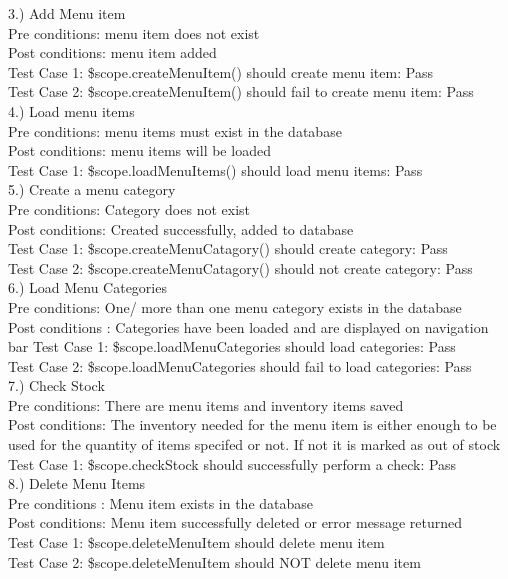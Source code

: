 \documentclass[a4paper,12pt]{report}
\begin{document}
3.) Add Menu item \\
Pre conditions: menu item does not exist\\
Post conditions: menu item added\\
Test Case 1: \$scope.createMenuItem() should create menu item: Pass\\
Test Case 2: \$scope.createMenuItem() should fail to create menu item: Pass\\

4.) Load menu items \\
Pre conditions: menu items must exist in the database\\
Post conditions: menu items will be loaded \\
Test Case 1: \$scope.loadMenuItems() should load menu items: Pass \\ 

5.) Create a menu category \\ 
Pre conditions: Category does not exist \\
Post conditions: Created successfully, added to database\\
Test Case 1: \$scope.createMenuCatagory() should create category: Pass \\
Test Case 2: \$scope.createMenuCatagory() should not create category: Pass \\

6.) Load Menu Categories \\
Pre conditions: One/ more than one menu category exists in the database \\
Post conditions : Categories have been loaded and are displayed on navigation bar 
Test Case 1: \$scope.loadMenuCategories should load categories: Pass \\
Test Case 2: \$scope.loadMenuCategories should fail to load categories: Pass \\

7.) Check Stock \\
Pre conditions: There are menu items and inventory items saved\\
Post conditions: The inventory needed for the menu item is either enough to be used for the quantity of items specifed or not. If not it is marked as out of stock\\
Test Case 1: \$scope.checkStock should successfully perform a check: Pass \\  

8.) Delete Menu Items \\
Pre conditions : Menu item exists in the database \\
Post conditions: Menu item successfully deleted or error message returned \\
Test Case 1: \$scope.deleteMenuItem should delete menu item \\
Test Case 2: \$scope.deleteMenuItem should NOT delete menu item\\
\end{document}
